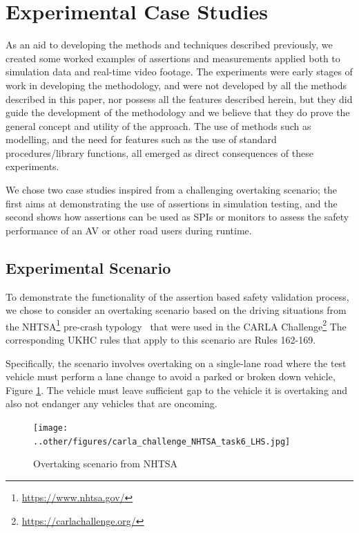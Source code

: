 \section{Experimental Case Studies} \label{Experimental_scenario}
As an aid to developing the methods and techniques described previously, we created some worked examples of assertions and measurements applied both to simulation data and real-time video footage. The experiments were early stages of work in developing the methodology, and were not developed by all the methods described in this paper, nor possess all the features described herein, but they did guide the development of the methodology and we believe that they do prove the general concept and utility of the approach. The use of methods such as modelling, and the need for features such as the use of standard procedures/library functions, all emerged as direct consequences of these experiments.

We chose two case studies inspired from a challenging overtaking scenario; the first aims at demonstrating the use of assertions in simulation testing, and the second shows how assertions can be used as SPIs or monitors to assess the safety performance of an AV or other road users during runtime.

\subsection{Experimental Scenario} %
\label{carla_challenge}
To demonstrate the functionality of the assertion based safety validation process, we chose to consider an overtaking scenario based on the driving situations from the NHTSA\footnote{\url{https://www.nhtsa.gov/}} pre-crash typology~\cite{nhtsa_precrash} that were used in the CARLA Challenge\footnote{\url{https://carlachallenge.org/}} The corresponding UKHC rules \cite{highwayCode} that apply to this scenario are Rules 162-169.

Specifically, the scenario involves overtaking on a single-lane road where the test vehicle must perform a lane change to avoid a parked or broken down vehicle, Figure \ref{fig:carla_challenge_NHTSA_task6_LHS}. The vehicle must leave sufficient gap to the vehicle it is overtaking and also not endanger any vehicles that are oncoming.

\begin{figure}[htp]
    \centering
    \texttt{[image: ..other/figures/carla\_challenge\_NHTSA\_task6\_LHS.jpg]}
    \caption{Overtaking scenario from NHTSA~\cite{nhtsa_precrash}}
    \label{fig:carla_challenge_NHTSA_task6_LHS}
\end{figure} 

